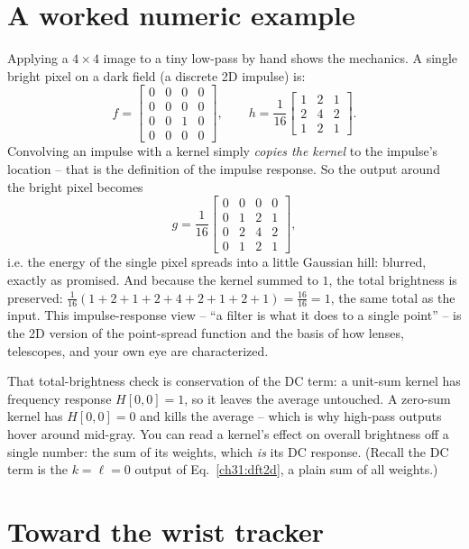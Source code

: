 \section{A worked numeric example}
\label{ch31:worked}

Applying a $4\times4$ image to a tiny low-pass by hand shows the mechanics. A single bright pixel on a dark field (a discrete 2D
impulse) is:
\[
f = \begin{bmatrix}
0&0&0&0\\ 0&0&0&0\\ 0&0&1&0\\ 0&0&0&0
\end{bmatrix},
\qquad
h = \frac{1}{16}\begin{bmatrix}1&2&1\\2&4&2\\1&2&1\end{bmatrix}.
\]
Convolving an impulse with a kernel simply \emph{copies the kernel} to the
impulse's location -- that is the definition of the impulse response. So the output
around the bright pixel becomes
\[
g = \frac{1}{16}\begin{bmatrix}
0&0&0&0\\ 0&1&2&1\\ 0&2&4&2\\ 0&1&2&1
\end{bmatrix},
\]
i.e. the energy of the single pixel spreads into a little Gaussian hill: blurred,
exactly as promised. And because the kernel summed to $1$, the total brightness is
preserved: $\tfrac1{16}(1+2+1+2+4+2+1+2+1) = \tfrac{16}{16} = 1$, the same total as
the input. This impulse-response view -- ``a filter is what it does to a single
point'' -- is the 2D version of the point-spread function and the basis of how
lenses, telescopes, and your own eye are characterized.

\begin{connectionbox}
That total-brightness check is conservation of the DC term: a unit-sum kernel has
frequency response $H[0,0]=1$, so it leaves the average untouched. A zero-sum
kernel has $H[0,0]=0$ and kills the average -- which is why high-pass outputs hover
around mid-gray. You can read a kernel's effect on overall brightness off a single
number: the sum of its weights, which \emph{is} its DC response. (Recall the DC
term is the $k=\ell=0$ output of Eq.~\eqref{ch31:dft2d}, a plain sum of all
weights.)
\end{connectionbox}

\section{Toward the wrist tracker}
\label{ch31:goal}

